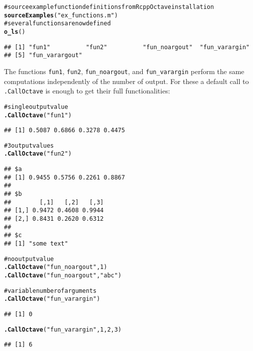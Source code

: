 \documentclass[english,10pt,a4paper]{article}\usepackage{graphicx, color}
\makeatletter
\newcommand{\hlfunctioncall}[1]{\textcolor[rgb]{0.501960784313725,0,0.329411764705882}{\textbf{#1}}}%
\newcommand{\hlstring}[1]{\textcolor[rgb]{0.6,0.6,1}{#1}}%
\newcommand{\hlcomment}[1]{\textcolor[rgb]{0.180392156862745,0.6,0.341176470588235}{#1}}%
\newenvironment{kframe}{%
 \def\at@end@of@kframe{}%
 \ifinner\ifhmode%
  \def\at@end@of@kframe{\end{minipage}}%
  \begin{minipage}{\columnwidth}%
 \fi\fi%
 \def\FrameCommand##1{\hskip\@totalleftmargin \hskip-\fboxsep
 \colorbox{shadecolor}{##1}\hskip-\fboxsep
     \hskip-\linewidth \hskip-\@totalleftmargin \hskip\columnwidth}%
 \MakeFramed {\advance\hsize-\width
   \@totalleftmargin\z@ \linewidth\hsize
   \@setminipage}}%
 {\par\unskip\endMakeFramed%
 \at@end@of@kframe}
\newenvironment{knitrout}{}{} %
\let\code=\texttt
\makeatother
\begin{document}
\begin{knitrout}
\color{fgcolor}\begin{kframe}
\begin{alltt}
\hlcomment{# source example function definitions from RcppOctave installation}
\hlfunctioncall{sourceExamples}(\hlstring{"ex_functions.m"})
\hlcomment{# several functions are now defined}
\hlfunctioncall{o_ls}()
\end{alltt}
\begin{verbatim}
## [1] "fun1"          "fun2"          "fun_noargout"  "fun_varargin" 
## [5] "fun_varargout"
\end{verbatim}
\end{kframe}
\end{knitrout}


The functions \code{fun1}, \code{fun2}, \code{fun\_noargout}, and
\code{fun\_varargin} perform the same computations independently of the number
of output.
For these a default call to \code{.CallOctave} is enough to get their full
functionalities:

\begin{knitrout}
\color{fgcolor}\begin{kframe}
\begin{alltt}
\hlcomment{# single output value}
\hlfunctioncall{.CallOctave}(\hlstring{"fun1"})
\end{alltt}
\begin{verbatim}
## [1] 0.5087 0.6866 0.3278 0.4475
\end{verbatim}
\begin{alltt}
\hlcomment{# 3 output values}
\hlfunctioncall{.CallOctave}(\hlstring{"fun2"})
\end{alltt}
\begin{verbatim}
## $a
## [1] 0.9455 0.5756 0.2261 0.8867
## 
## $b
##        [,1]   [,2]   [,3]
## [1,] 0.9472 0.4608 0.9944
## [2,] 0.8431 0.2620 0.6312
## 
## $c
## [1] "some text"
\end{verbatim}
\begin{alltt}

\hlcomment{# no output value}
\hlfunctioncall{.CallOctave}(\hlstring{"fun_noargout"}, 1)
\hlfunctioncall{.CallOctave}(\hlstring{"fun_noargout"}, \hlstring{"abc"})

\hlcomment{# variable number of arguments}
\hlfunctioncall{.CallOctave}(\hlstring{"fun_varargin"})
\end{alltt}
\begin{verbatim}
## [1] 0
\end{verbatim}
\begin{alltt}
\hlfunctioncall{.CallOctave}(\hlstring{"fun_varargin"}, 1, 2, 3)
\end{alltt}
\begin{verbatim}
## [1] 6
\end{verbatim}
\end{kframe}
\end{knitrout}
\end{document}
